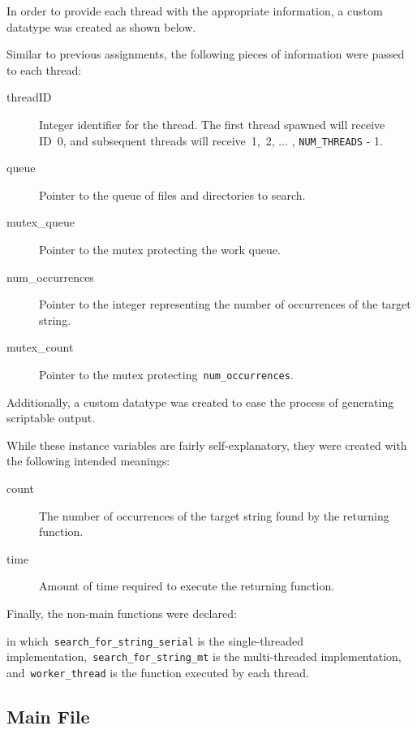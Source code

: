 \documentclass{article}
\newcommand{\hlst}[2]{
	\begin{center}
	\parbox{.6\textwidth}{
	}
	\end{center}
}
\newcommand{\ttt}[1]{\texttt{#1}}
\begin{document}
In order to provide each thread with the appropriate information, a custom
datatype was created as shown below.
%
\hlst{12}{25}
%
Similar to previous assignments, the following pieces of information were
passed to each thread:
%
\begin{center}
\parbox{.85\textwidth}{
\begin{description}
	\item[threadID]{Integer identifier for the thread.  The first thread
	spawned will receive ID~0, and subsequent threads will receive~1,~2,
	$\ldots$ , \ttt{NUM\_THREADS} - 1.}
	\item[queue]{Pointer to the queue of files and directories to search.}
	\item[mutex\_queue]{Pointer to the mutex protecting the work queue.}
	\item[num\_occurrences]{Pointer to the integer representing the number of occurrences of the target string.}
	\item[mutex\_count]{Pointer to the mutex protecting~\ttt{num\_occurrences}.}
\end{description}
}
\end{center}
%
Additionally, a custom datatype was created to ease the process of generating
scriptable output.
%
\hlst{27}{34}
%
While these instance variables are fairly self-explanatory, they were created
with the following intended meanings:
%
\begin{center}
\parbox{.85\textwidth}{
\begin{description}
	\item[count]{The number of occurrences of the target string found by the returning function.}
	\item[time]{Amount of time required to execute the returning function.}
\end{description}
}
\end{center}

Finally, the non-main functions were declared:
%
\hlst{36}{39}
%
in which~\ttt{search\_for\_string\_serial} is the single-threaded
implementation,~\ttt{search\_for\_string\_mt} is the multi-threaded
implementation, and~\ttt{worker\_thread} is the function executed by each
thread.

\subsection{Main File}
\end{document}
